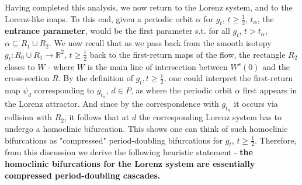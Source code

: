 \documentclass[10pt,reqno]{amsart}
\theoremstyle{plain}
\theoremstyle{assumption}
\theoremstyle{notation}
\theoremstyle{claim}
\theoremstyle{conj}
\theoremstyle{theorem}
\theoremstyle{proposition}
\theoremstyle{corollary}
\begin{document}
Having completed this analysis, we now return to the Lorenz system, and to the Lorenz-like maps. To this end, given a periodic orbit $\alpha$ for $g_t$, $t\geq\frac{1}{2}$, $t_\alpha$, the \textbf{entrance parameter}, would be the first parameter s.t. for all $g_t$, $t>t_\alpha$, $\alpha\subseteq R_1\cup R_2$. We now recall that as we pass back from the smooth isotopy $g_t:R_0\cup R_1\to\mathbb{R}^2$, $t\geq\frac{1}{2}$ back to the first-return maps of the flow, the rectangle $R_2$ closes to $W$ - where $W$ is the main line of intersection between $W^s(0)$ and the cross-section $R$.  By the definition of $g_t,t\geq\frac{1}{2}$, one could interpret the first-return map $\psi_d$ corresponding to $g_{t_\alpha}$, $d\in P$, as where the periodic orbit $\alpha$ first appears in the Lorenz attractor. And since by the correspondence with $g_{t_\alpha}$ it occurs via collision with $R_2$, it follows that at $d$ the corresponding Lorenz system has to undergo a homoclinic bifurcation. This shows one can think of such homoclinic bifurcations as "compressed" period-doubling bifurcations for $g_t$, $t\geq\frac{1}{2}$. Therefore, from this discussion we derive the following heuristic statement - \textbf{the homoclinic bifurcations for the Lorenz system are essentially compressed period-doubling cascades.}


\printbibliography
\end{document}
